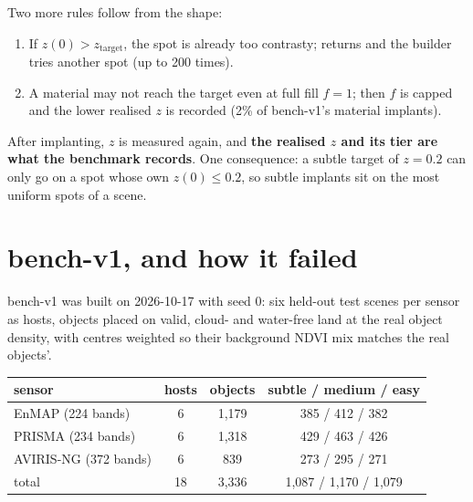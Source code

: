 Two more rules follow from the shape:
\begin{enumerate}
\item If $z(0) > z_{\text{target}}$, the spot is already too contrasty;  returns  and
the builder tries another spot (up to 200 times).
\item A material may not reach the target even at full fill $f = 1$; then $f$ is capped and the lower realised $z$ is
recorded (2\% of bench-v1's material implants\hfil{}\hfilneg{}).
\end{enumerate}
After implanting, $z$ is measured again, and \textbf{the realised $z$ and its tier are what the benchmark records}.
One consequence: a subtle target of $z = 0.2$ can only go on a spot whose own $z(0) \le 0.2$, so subtle implants sit
on the most uniform spots of a scene.


\section{bench-v1, and how it failed}\label{sec:benchmarks:v1}

bench-v1 was built on 2026-10-17 with seed 0: six held-out test scenes per sensor as hosts, objects placed on valid,
cloud- and water-free land at the real object density, with centres weighted so their background NDVI mix matches the
real objects'\hfil{}\hfilneg{}.

\begin{center}
\begin{tabular}{lccc}
\toprule
sensor & hosts & objects & subtle / medium / easy \\
\midrule
EnMAP (224 bands) & 6 & 1,179 & 385 / 412 / 382 \\
PRISMA (234 bands) & 6 & 1,318 & 429 / 463 / 426 \\
AVIRIS-NG (372 bands) & 6 & 839 & 273 / 295 / 271 \\
total & 18 & 3,336 & 1,087 / 1,170 / 1,079 \\
\bottomrule
\end{tabular}
\end{center}

